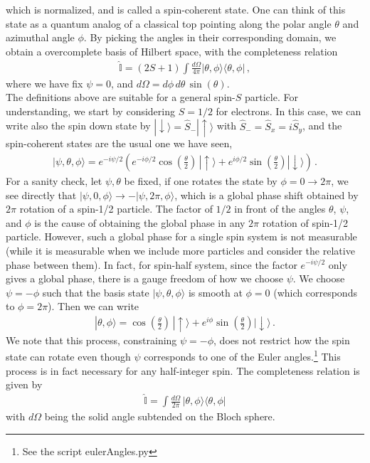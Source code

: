 \documentclass[11pt, onesided]{book}
\theoremstyle{break}
\theoremstyle{break}
\begin{document}
which is normalized, and is called a spin-coherent state. One can think of this state as a quantum analog of a classical top pointing along the polar angle $\theta$ and azimuthal angle $\phi$. By picking the angles in their corresponding domain, we obtain a overcomplete basis of Hilbert space, with the completeness relation 
\begin{align*}
\hat{\mathbb{I}} = (2S+1) \int \frac{d\Omega}{4\pi}|\theta, \phi\rangle \langle \theta, \phi|\,,
\end{align*}
where we have fix $\psi = 0$, and $d\Omega = d\phi\, d\theta\, \sin(\theta)$. \\

The definitions above are suitable for a general spin-$S$ particle. For understanding, we start by considering $S=1/2$ for electrons. In this case, we can write also the spin down state by $|\downarrow\rangle = \hat{S}_- |\uparrow\rangle$ with $\hat{S}_- = \hat{S}_x = i\hat{S}_y$, and the spin-coherent states are the usual one we have seen,
\begin{align*}
|\psi,\theta,\phi\rangle = e^{-i\psi/2}\left( e^{-i\phi/2}\cos\left(\frac{\theta}{2}\right) \, |\uparrow\rangle + e^{i\phi/2}\sin\left(\frac{\theta}{2}\right) |\downarrow\rangle\right)\,.
\end{align*}
For a sanity check, let $\psi,\theta$ be fixed, if one rotates the state by $\phi=0\to 2\pi$, we see directly that $|\psi, 0,\phi\rangle\to -|\psi, 2\pi,\phi\rangle$, which is a global phase shift obtained by $2\pi$ rotation of a spin-1/2 particle. The factor of $1/2$ in front of the angles $\theta$, $\psi$, and $\phi$ is the cause of obtaining the global phase in any $2\pi$ rotation of spin-1/2 particle. However, such a global phase for a single spin system is not measurable (while it is measurable when we include more particles and consider the relative phase between them). In fact, for spin-half system, since the factor $e^{-i\psi/2}$ only gives a global phase, there is a gauge freedom of how we choose $\psi$. We choose $\psi = -\phi$ such that the basis state $|\psi,\theta, \phi\rangle$ is smooth at $\phi=0$ (which corresponds to $\phi = 2\pi$). Then we can write
\begin{align*}
|\theta,\phi\rangle = \cos\left(\frac{\theta}{2}\right) \, |\uparrow\rangle + e^{i\phi}\sin\left(\frac{\theta}{2}\right) |\downarrow\rangle\,.\tag{$\dagger$}
\end{align*}
We note that this process, constraining $\psi = -\phi$, does not restrict how the spin state can rotate even though $\psi$ corresponds to one of the Euler angles.\footnote{See the script eulerAngles.py}  
This process is in fact necessary for any half-integer spin. The completeness relation is given by 
\begin{align*}
\hat{\mathbb{I}} = \int \frac{d\Omega}{2\pi}\, |\theta, \phi\rangle\langle \theta, \phi|
\end{align*}
with $d\Omega$ being the solid angle subtended on the Bloch sphere. \\
\end{document}

